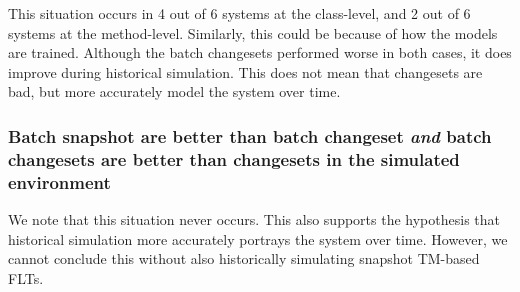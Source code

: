 %

This situation occurs in 4 out of 6 systems at the class-level, and 2 out of 6
systems at the method-level.  Similarly, this could be because of how the models
are trained.  Although the batch changesets performed worse in both cases, it
does improve during historical simulation.  This does not mean that changesets
are bad, but more accurately model the system over time.

\subsubsection{Batch snapshot are better than batch changeset
\emph{and} batch changesets are better than changesets in the simulated environment}

%
%
We note that this situation never occurs.  This also supports the hypothesis
that historical simulation more accurately portrays the system over time.
However, we cannot conclude this without also historically simulating snapshot
TM-based FLTs.
